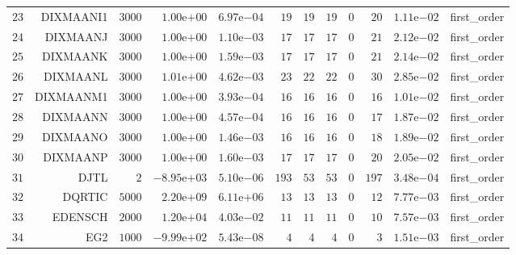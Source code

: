 \begin{longtable}{rrrrrrrrrrrr}
  \(    23\) & DIXMAANI1 & \(  3000\) & \( 1.00\)e\(+00\) & \( 6.97\)e\(-04\) & \(    19\) & \(    19\) & \(    19\) & \(     0\) & \(    20\) & \( 1.11\)e\(-02\) & first\_order \\
  \(    24\) & DIXMAANJ & \(  3000\) & \( 1.00\)e\(+00\) & \( 1.10\)e\(-03\) & \(    17\) & \(    17\) & \(    17\) & \(     0\) & \(    21\) & \( 2.12\)e\(-02\) & first\_order \\
  \(    25\) & DIXMAANK & \(  3000\) & \( 1.00\)e\(+00\) & \( 1.59\)e\(-03\) & \(    17\) & \(    17\) & \(    17\) & \(     0\) & \(    21\) & \( 2.14\)e\(-02\) & first\_order \\
  \(    26\) & DIXMAANL & \(  3000\) & \( 1.01\)e\(+00\) & \( 4.62\)e\(-03\) & \(    23\) & \(    22\) & \(    22\) & \(     0\) & \(    30\) & \( 2.85\)e\(-02\) & first\_order \\
  \(    27\) & DIXMAANM1 & \(  3000\) & \( 1.00\)e\(+00\) & \( 3.93\)e\(-04\) & \(    16\) & \(    16\) & \(    16\) & \(     0\) & \(    16\) & \( 1.01\)e\(-02\) & first\_order \\
  \(    28\) & DIXMAANN & \(  3000\) & \( 1.00\)e\(+00\) & \( 4.57\)e\(-04\) & \(    16\) & \(    16\) & \(    16\) & \(     0\) & \(    17\) & \( 1.87\)e\(-02\) & first\_order \\
  \(    29\) & DIXMAANO & \(  3000\) & \( 1.00\)e\(+00\) & \( 1.46\)e\(-03\) & \(    16\) & \(    16\) & \(    16\) & \(     0\) & \(    18\) & \( 1.89\)e\(-02\) & first\_order \\
  \(    30\) & DIXMAANP & \(  3000\) & \( 1.00\)e\(+00\) & \( 1.60\)e\(-03\) & \(    17\) & \(    17\) & \(    17\) & \(     0\) & \(    20\) & \( 2.05\)e\(-02\) & first\_order \\
  \(    31\) & DJTL & \(     2\) & \(-8.95\)e\(+03\) & \( 5.10\)e\(-06\) & \(   193\) & \(    53\) & \(    53\) & \(     0\) & \(   197\) & \( 3.48\)e\(-04\) & first\_order \\
  \(    32\) & DQRTIC & \(  5000\) & \( 2.20\)e\(+09\) & \( 6.11\)e\(+06\) & \(    13\) & \(    13\) & \(    13\) & \(     0\) & \(    12\) & \( 7.77\)e\(-03\) & first\_order \\
  \(    33\) & EDENSCH & \(  2000\) & \( 1.20\)e\(+04\) & \( 4.03\)e\(-02\) & \(    11\) & \(    11\) & \(    11\) & \(     0\) & \(    10\) & \( 7.57\)e\(-03\) & first\_order \\
  \(    34\) & EG2 & \(  1000\) & \(-9.99\)e\(+02\) & \( 5.43\)e\(-08\) & \(     4\) & \(     4\) & \(     4\) & \(     0\) & \(     3\) & \( 1.51\)e\(-03\) & first\_order \\

\end{longtable}
